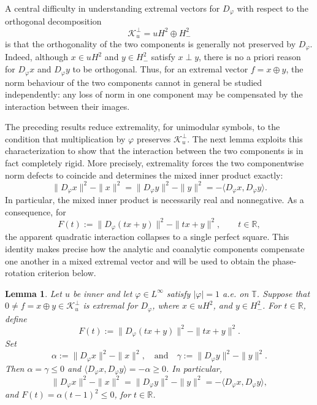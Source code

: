 \documentclass[12pt]{amsart}
\newtheorem{lemma}[theorem]{Lemma}
\theoremstyle{definition}
\theoremstyle{remark}
\def \R{\mathbb{R}}
\def \T{\mathbb{T}}
\newcommand{\clk}{\mathcal{K}}
\newcommand{\vp}{\varphi}
\numberwithin{equation}{section}
\begin{document}
A central difficulty in understanding extremal vectors for $D_\vp$
with respect to the orthogonal decomposition
\[
\clk_u^\perp=uH^2\oplus H^2_{-}
\]
is that the orthogonality of the two components is generally not
preserved by $D_\vp$. Indeed, although $x\in uH^2$ and
$y\in H^2_{-}$ satisfy $x\perp y$, there is no a priori reason for
$D_\vp x$ and $D_\vp y$ to be orthogonal. Thus, for an extremal vector $f=x\oplus y$, the norm behaviour of the two components cannot in general be studied independently: any loss of norm in one component may be compensated by the interaction between their images.

The preceding results reduce extremality, for unimodular symbols, to
the condition that multiplication by $\vp$ preserves $\clk_u^\perp$. The next lemma exploits this characterization to show that the interaction between the two components is in fact completely
rigid. More precisely, extremality forces the two componentwise norm
defects to coincide and determines the mixed inner product exactly:
\[
\|D_\vp x\|^2-\|x\|^2=\|D_\vp y\|^2-\|y\|^2=-\langle D_\vp x,D_\vp y\rangle.
\]
In particular, the mixed inner product is necessarily real and
nonnegative. As a consequence, for
\[
F(t):=\|D_\vp(tx+y)\|^2-\|tx+y\|^2,
\qquad t\in\R,
\]
the apparent quadratic interaction collapses to a single perfect
square. This identity makes precise how the analytic and coanalytic
components compensate one another in a mixed extremal vector and will
be used to obtain the phase-rotation criterion below.




\begin{lemma}\label{lem:quad-identities}
Let $u$ be inner and let $\vp\in L^\infty$ satisfy $|\vp|=1$ a.e. on $\T$. Suppose that $0\neq f=x\oplus y\in\clk_u^\perp$ is extremal for $D_\vp$, where $x\in uH^2$, and $y\in H^2_{-}$. For $t\in\R$, define
\[
F(t):=\|D_\vp(tx+y)\|^2-\|tx+y\|^2.
\]
Set
\[
\alpha:=\|D_\vp x\|^2-\|x\|^2, \quad\text{and}\quad \gamma:=\|D_\vp y\|^2-\|y\|^2.
\]
Then $\alpha=\gamma\leq 0$ and $\langle D_\vp x,D_\vp y\rangle=-\alpha\geq0$. In particular,
\[
\|D_\vp x\|^2-\|x\|^2=\|D_\vp y\|^2-\|y\|^2 =-\langle D_\vp x,D_\vp y\rangle,
\]
and $F(t)=\alpha(t-1)^2\leq0$, for $t\in \R$.
\end{lemma}
\end{document}
